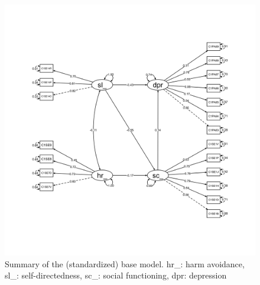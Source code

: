 \documentclass[11pt]{article}
\begin{document}
\begin{figure}[h]
\centering
\includegraphics[width=14cm]{../visualizations/base_model.png}
\caption{Summary of the (standardized) base model. hr\_: harm avoidance,
         sl\_: self-directedness, sc\_: social functioning, dpr: depression}
\end{figure}

\end{document}
